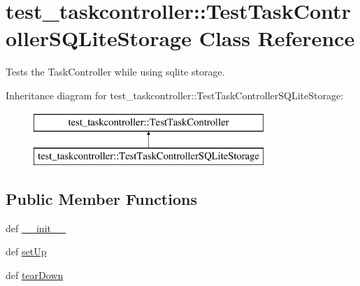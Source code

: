 \hypertarget{classtest__taskcontroller_1_1TestTaskControllerSQLiteStorage}{
\section{test\-\_\-taskcontroller\-:\-:\-Test\-Task\-Controller\-S\-Q\-Lite\-Storage \-Class \-Reference}
\label{classtest__taskcontroller_1_1TestTaskControllerSQLiteStorage}
}


\-Tests the \-Task\-Controller while using sqlite storage.  


\-Inheritance diagram for test\-\_\-taskcontroller\-:\-:\-Test\-Task\-Controller\-S\-Q\-Lite\-Storage\-:\begin{figure}[H]
\begin{center}
\leavevmode
\includegraphics[height=2.000000cm]{classtest__taskcontroller_1_1TestTaskControllerSQLiteStorage}
\end{center}
\end{figure}
\subsection*{\-Public \-Member \-Functions}
\begin{DoxyCompactItemize}
\item 
def \hyperlink{classtest__taskcontroller_1_1TestTaskControllerSQLiteStorage_a29417d2c4aee8c9bd135faff67203edc}{\-\_\-\-\_\-init\-\_\-\-\_\-}
\item 
def \hyperlink{classtest__taskcontroller_1_1TestTaskControllerSQLiteStorage_af9e2857d37a141eefd0fa801d22d2666}{set\-Up}
\item 
def \hyperlink{classtest__taskcontroller_1_1TestTaskControllerSQLiteStorage_ae9e702f3aa351b7f2f6a46fab57af8be}{tear\-Down}
\end{DoxyCompactItemize}
